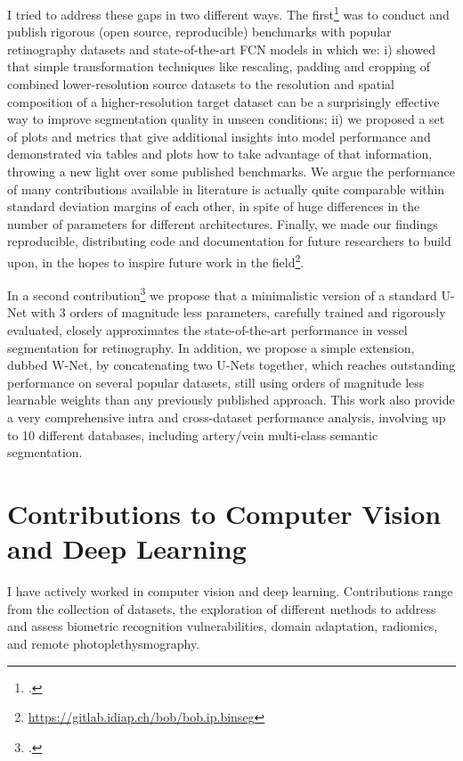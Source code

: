\documentclass[a4paper,10pt,onecolumn]{article}
\begin{document}
I tried to address these gaps in two different ways.  The
first\footcite{arxiv-2019} was to conduct and publish rigorous (open source,
reproducible) benchmarks with popular retinography datasets and
state-of-the-art FCN models in which we: i) showed that simple transformation
techniques like rescaling, padding and cropping of combined lower-resolution
source datasets to the resolution and spatial composition of a
higher-resolution target dataset can be a surprisingly effective way to improve
segmentation quality in unseen conditions; ii) we proposed a set of plots and
metrics that give additional insights into model performance and demonstrated
via tables and plots how to take advantage of that information, throwing a new
light over some published benchmarks.  We argue the performance of many
contributions available in literature is actually quite comparable within
standard deviation margins of each other, in spite of huge differences in the
number of parameters for different architectures.  Finally, we made our
findings reproducible, distributing code and documentation for future
researchers to build upon, in the hopes to inspire future work in the
field\footnote{\url{https://gitlab.idiap.ch/bob/bob.ip.binseg}}.

In a second contribution\footcite{nsr-2022} we propose that a minimalistic
version of a standard U-Net with 3 orders of magnitude less parameters,
carefully trained and rigorously evaluated, closely approximates the
state-of-the-art performance in vessel segmentation for retinography.  In
addition, we propose a simple extension, dubbed W-Net, by concatenating two
U-Nets together, which reaches outstanding performance on several popular
datasets, still using orders of magnitude less learnable weights than any
previously published approach.  This work also provide a very comprehensive
intra and cross-dataset performance analysis, involving up to 10 different
databases, including artery/vein multi-class semantic segmentation.

\section{Contributions to Computer Vision and Deep Learning}

I have actively worked in computer vision and deep learning. Contributions
range from the collection of datasets, the exploration of different methods to
address and assess biometric recognition vulnerabilities, domain adaptation,
radiomics, and remote photoplethysmography.
\end{document}
